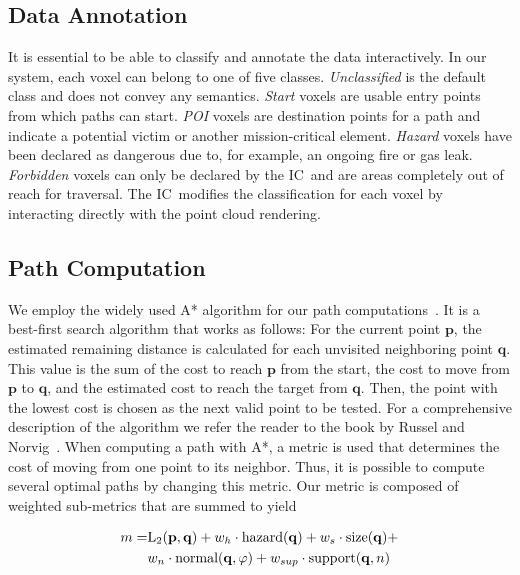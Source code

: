 \documentclass[conference,10pt,letter]{IEEEtran}
\def\IC{IC}
\begin{document}
\subsection{Data Annotation} \label{sec:overview:annotation}
It is essential to be able to classify and annotate the data interactively. In our system, each voxel can belong to one of five classes. \emph{Unclassified} is the default class and does not convey any semantics. \emph{Start} voxels are usable entry points from which paths can start. \emph{POI} voxels are destination points for a path and indicate a potential victim or another mission-critical element. \emph{Hazard} voxels have been declared as dangerous due to, for example, an ongoing fire or gas leak. \emph{Forbidden} voxels can only be declared by the \IC\ and are areas completely out of reach for traversal. The \IC\ modifies the classification for each voxel by interacting directly with the point cloud rendering.

\subsection{Path Computation} \label{sec:overview:pathcomputation}
We employ the widely used A* algorithm for our path computations~\cite{4082128}. It is a best-first search algorithm that works as follows: For the current point $\mathbf{p}$, the estimated remaining distance is calculated for each unvisited neighboring point $\mathbf{q}$. This value is the sum of the cost to reach $\mathbf{p}$ from the start, the cost to move from $\mathbf{p}$ to $\mathbf{q}$, and the estimated cost to reach the target from $\mathbf{q}$. Then, the point with the lowest cost is chosen as the next valid point to be tested. For a comprehensive description of the algorithm we refer the reader to the book by Russel and Norvig~\cite{AStar}. When computing a path with A*, a metric is used that determines the cost of moving from one point to its neighbor. Thus, it is possible to compute several optimal paths by changing this metric. Our metric is composed of weighted sub-metrics that are summed to yield

\begin{equation}
\begin{array}{r@{}l}
m = & \textrm{L}_2(\mathbf{p},\mathbf{q}) + w_h \cdot \textrm{hazard}(\mathbf{q}) + w_s \cdot \textrm{size}(\mathbf{q}) + \vspace*{0.1cm} \\
  & w_n \cdot \textrm{normal}(\mathbf{q},\varphi) + w_{sup} \cdot \textrm{support}(\mathbf{q},n)
\end{array}
\end{equation}
\end{document}
